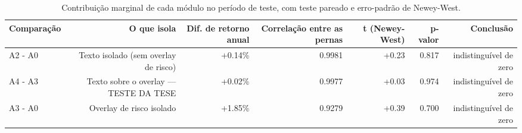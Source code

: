 \begin{table}[htbp]
\centering
\caption{Contribuição marginal de cada módulo no período de teste, com teste pareado e erro-padrão de Newey-West.}
\label{tab:significancia}
\begin{tabular}{lrrrrrr}
\toprule
Comparação & O que isola & Dif. de retorno anual & Correlação entre as pernas & t (Newey-West) & p-valor & Conclusão \\
\midrule
A2 - A0 & Texto isolado (sem overlay de risco) & +0.14\% & 0.9981 & +0.23 & 0.817 & indistinguível de zero \\
A4 - A3 & Texto sobre o overlay — TESTE DA TESE & +0.02\% & 0.9977 & +0.03 & 0.974 & indistinguível de zero \\
A3 - A0 & Overlay de risco isolado & +1.85\% & 0.9279 & +0.39 & 0.700 & indistinguível de zero \\
\bottomrule
\end{tabular}
\end{table}
